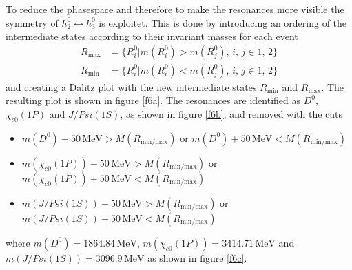 To reduce the phasespace and therefore to make the resonances more visible the symmetry of $h_2^0 \leftrightarrow h_3^0$ is 
exploitet. This is done by introducing an ordering of the intermediate states according to their invariant masses for each event
\begin{align*}
  R_\text{max} &= \{R_i^0 | m(R_i^0) > m(R_j^0) , \, i,\,j \in {1, \, 2}\} \\
  R_\text{min} &= \{R_i^0 | m(R_i^0) < m(R_j^0) , \, i,\,j \in {1, \, 2}\} 
\end{align*}
and creating a Dalitz plot with the new intermediate states $R_\text{min}$ and $R_\text{max}$. 
The resulting plot is shown in figure \ref{f6a}. The resonances are identified as $D^0$, $\chi_{c0}(1P)$ and $J/Psi(1S)$, as 
shown in figure \ref{f6b}, and removed with the cuts 
\begin{itemize}
  \item $m(D^0) - 50 \, \si{\mega\eV} > M(R_{\text{min/max}})$ or $m(D^0) + 50 \, \si{\mega\eV} < M(R_{\text{min/max}})$
  \item $m(\chi_{c0}(1P)) - 50 \, \si{\mega\eV} > M(R_{\text{min/max}})$ or $m(\chi_{c0}(1P)) + 50 \, \si{\mega\eV} < M(R_{\text{min/max}})$
  \item $m(J/Psi(1S)) - 50 \, \si{\mega\eV} > M(R_{\text{min/max}})$ or $m(J/Psi(1S)) + 50 \, \si{\mega\eV} < M(R_{\text{min/max}})$
\end{itemize}
where $m(D^0) = 1864.84 \, \si{\mega\eV}$, $m(\chi_{c0}(1P)) = 3414.71 \, \si{\mega\eV}$ and $m(J/Psi(1S)) = 3096.9  \, \si{\mega\eV}$ \cite{pdg} 
as shown in figure \ref{f6c}.

